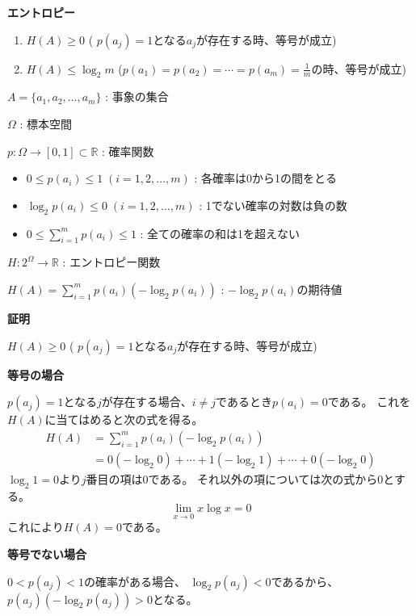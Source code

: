 \documentclass[12pt,b5paper]{ltjsarticle}
\begin{document}
\textbf{エントロピー}

\begin{enumerate}
 \item $H(A) \geq 0$ ( $p(a_j)=1$となる$a_j$が存在する時、等号が成立)
 \item $H(A) \leq \log_{2}{m}$ ($p(a_1)=p(a_2)=\cdots =p(a_m)=\frac{1}{m}$の時、等号が成立)
\end{enumerate}

\dotfill

$A=\{a_1,a_2,\dots,a_m\}$ : 事象の集合

$\Omega$ : 標本空間

$p : \Omega \rightarrow [0,1] \subset \mathbb{R}$ : 確率関数
\begin{itemize}
 \item $0 \leq p(a_i) \leq 1 \; (i=1,2,\dots,m)$ : 各確率は0から1の間をとる
 \item $\log_{2}{p(a_i)} \leq 0 \; (i=1,2,\dots,m)$ : 1でない確率の対数は負の数
 \item $0 \leq \sum_{i=1}^{m} p(a_i) \leq 1$ : 全ての確率の和は1を超えない
\end{itemize}

$H : 2^{\Omega} \rightarrow \mathbb{R}$ : エントロピー関数


$H(A) = \sum_{i=1}^{m} p(a_i) \left( -\log_{2}{p(a_i)} \right)$
: $-\log_{2}{p(a_i)}$の期待値

\hrulefill

\textbf{証明}

$H(A) \geq 0$ ( $p(a_j)=1$となる$a_j$が存在する時、等号が成立)

\textbf{等号の場合}

$p(a_j)=1$となる$j$が存在する場合、$i\ne j$であるとき$p(a_i)=0$である。
これを$H(A)$に当てはめると次の式を得る。
\begin{align}
 H(A) &= \sum_{i=1}^{m} p(a_i) \left( -\log_{2}{p(a_i)} \right)\\
 &= 0(-\log_{2}{0}) + \cdots + 1(-\log_{2}{1}) + \cdots + 0(-\log_{2}{0})
\end{align}
$\log_{2}{1}=0$より$j$番目の項は$0$である。
それ以外の項については次の式から$0$とする。
\begin{equation}
 \lim_{x\rightarrow 0} x\log x =0
\end{equation}
これにより$H(A)=0$である。

\textbf{等号でない場合}

$0< p(a_j) <1$の確率がある場合、
$\log_{2}{p(a_j)}<0$であるから、$p(a_j)(-\log_{2}{p(a_j)})>0$となる。
\end{document}
